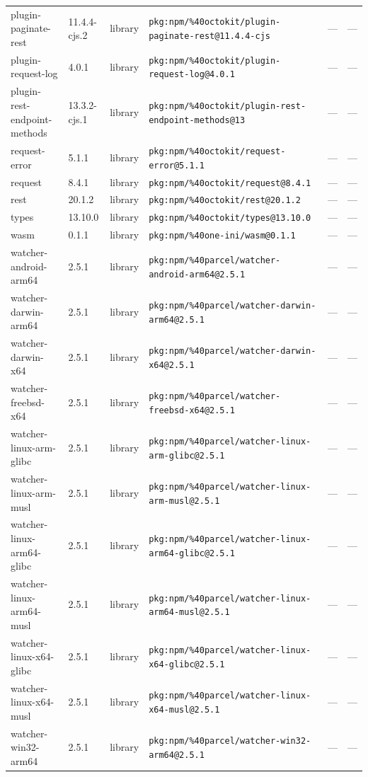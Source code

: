 \documentclass[11pt]{article}
\begin{document}
\begin{longtable}{|l|l|l|p{2.2cm}|l|p{4cm}|}
plugin-paginate-rest & 11.4.4-cjs.2 & library & \texttt{pkg:npm/\%40octokit/plugin-paginate-rest@11.4.4-cjs} & — & — \\
plugin-request-log & 4.0.1 & library & \texttt{pkg:npm/\%40octokit/plugin-request-log@4.0.1} & — & — \\
plugin-rest-endpoint-methods & 13.3.2-cjs.1 & library & \texttt{pkg:npm/\%40octokit/plugin-rest-endpoint-methods@13} & — & — \\
request-error & 5.1.1 & library & \texttt{pkg:npm/\%40octokit/request-error@5.1.1} & — & — \\
request & 8.4.1 & library & \texttt{pkg:npm/\%40octokit/request@8.4.1} & — & — \\
rest & 20.1.2 & library & \texttt{pkg:npm/\%40octokit/rest@20.1.2} & — & — \\
types & 13.10.0 & library & \texttt{pkg:npm/\%40octokit/types@13.10.0} & — & — \\
wasm & 0.1.1 & library & \texttt{pkg:npm/\%40one-ini/wasm@0.1.1} & — & — \\
watcher-android-arm64 & 2.5.1 & library & \texttt{pkg:npm/\%40parcel/watcher-android-arm64@2.5.1} & — & — \\
watcher-darwin-arm64 & 2.5.1 & library & \texttt{pkg:npm/\%40parcel/watcher-darwin-arm64@2.5.1} & — & — \\
watcher-darwin-x64 & 2.5.1 & library & \texttt{pkg:npm/\%40parcel/watcher-darwin-x64@2.5.1} & — & — \\
watcher-freebsd-x64 & 2.5.1 & library & \texttt{pkg:npm/\%40parcel/watcher-freebsd-x64@2.5.1} & — & — \\
watcher-linux-arm-glibc & 2.5.1 & library & \texttt{pkg:npm/\%40parcel/watcher-linux-arm-glibc@2.5.1} & — & — \\
watcher-linux-arm-musl & 2.5.1 & library & \texttt{pkg:npm/\%40parcel/watcher-linux-arm-musl@2.5.1} & — & — \\
watcher-linux-arm64-glibc & 2.5.1 & library & \texttt{pkg:npm/\%40parcel/watcher-linux-arm64-glibc@2.5.1} & — & — \\
watcher-linux-arm64-musl & 2.5.1 & library & \texttt{pkg:npm/\%40parcel/watcher-linux-arm64-musl@2.5.1} & — & — \\
watcher-linux-x64-glibc & 2.5.1 & library & \texttt{pkg:npm/\%40parcel/watcher-linux-x64-glibc@2.5.1} & — & — \\
watcher-linux-x64-musl & 2.5.1 & library & \texttt{pkg:npm/\%40parcel/watcher-linux-x64-musl@2.5.1} & — & — \\
watcher-win32-arm64 & 2.5.1 & library & \texttt{pkg:npm/\%40parcel/watcher-win32-arm64@2.5.1} & — & — \\

\end{longtable}
\end{document}
